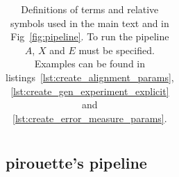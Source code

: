 \begin{table}
\begin{tabular}{|@{}c|p{4cm}|p{12.2cm}|}

    \hline 
  \end{tabular}
  \caption{
    Definitions of terms and relative symbols used in the main text and in 
    Fig~\ref{fig:pipeline}. To run the pipeline $\mathit{A}$, $\mathit{X}$ 
    and $\mathit{E}$ must be specified. Examples can be found in 
    listings~\ref{lst:create_alignment_params}, 
    \ref{lst:create_gen_experiment_explicit} and 
    \ref{lst:create_error_measure_params}.
  }
  \label{tab:definitions}
\end{table}

\subsection{pirouette's pipeline}
\label{subsec:pipeline}

